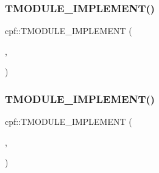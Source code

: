 \subsubsection{\texorpdfstring{T\+M\+O\+D\+U\+L\+E\+\_\+\+I\+M\+P\+L\+E\+M\+E\+N\+T()}{TMODULE\_IMPLEMENT()}\hspace{0.1cm}{\footnotesize\ttfamily [1/2]}}
{\footnotesize\ttfamily cpf\+::\+T\+M\+O\+D\+U\+L\+E\+\_\+\+I\+M\+P\+L\+E\+M\+E\+NT (\begin{DoxyParamCaption}\item[{\hyperlink{_platform_defines_8hpp_a1ca888bd091694c05472e1b91df1a97b}{D\+L\+L\+\_\+\+E\+X\+P\+O\+RT}}]{,  }\item[{\hyperlink{classcpf_1_1_render_window_manager}{Render\+Window\+Manager}}]{ }\end{DoxyParamCaption})}

\mbox{\label{namespacecpf_a795ee006ebcf092f9fa44444e150544e}} 
\subsubsection{\texorpdfstring{T\+M\+O\+D\+U\+L\+E\+\_\+\+I\+M\+P\+L\+E\+M\+E\+N\+T()}{TMODULE\_IMPLEMENT()}\hspace{0.1cm}{\footnotesize\ttfamily [2/2]}}
{\footnotesize\ttfamily cpf\+::\+T\+M\+O\+D\+U\+L\+E\+\_\+\+I\+M\+P\+L\+E\+M\+E\+NT (\begin{DoxyParamCaption}\item[{\hyperlink{_platform_defines_8hpp_a1ca888bd091694c05472e1b91df1a97b}{D\+L\+L\+\_\+\+E\+X\+P\+O\+RT}}]{,  }\item[{\hyperlink{classcpf_1_1_application}{Application}}]{ }\end{DoxyParamCaption})}

